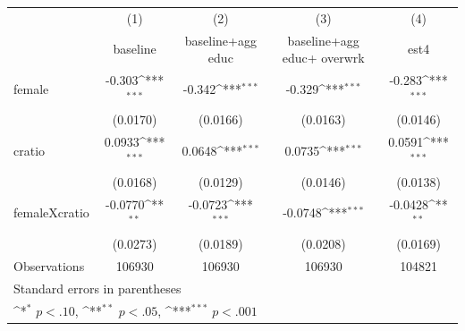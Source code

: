 {
\def\sym#1{\ifmmode^{#1}\else\(^{#1}\)\fi}
\begin{tabular}{l*{4}{c}}
\hline\hline
                    &\multicolumn{1}{c}{(1)}&\multicolumn{1}{c}{(2)}&\multicolumn{1}{c}{(3)}&\multicolumn{1}{c}{(4)}\\
                    &\multicolumn{1}{c}{baseline }&\multicolumn{1}{c}{baseline+agg educ}&\multicolumn{1}{c}{baseline+agg educ+ overwrk}&\multicolumn{1}{c}{est4}\\
\hline
female              &      -0.303\sym{***}&      -0.342\sym{***}&      -0.329\sym{***}&      -0.283\sym{***}\\
                    &    (0.0170)         &    (0.0166)         &    (0.0163)         &    (0.0146)         \\
[1em]
cratio              &      0.0933\sym{***}&      0.0648\sym{***}&      0.0735\sym{***}&      0.0591\sym{***}\\
                    &    (0.0168)         &    (0.0129)         &    (0.0146)         &    (0.0138)         \\
[1em]
femaleXcratio       &     -0.0770\sym{**} &     -0.0723\sym{***}&     -0.0748\sym{***}&     -0.0428\sym{**} \\
                    &    (0.0273)         &    (0.0189)         &    (0.0208)         &    (0.0169)         \\
\hline
Observations        &      106930         &      106930         &      106930         &      104821         \\
\hline\hline
\multicolumn{5}{l}{\footnotesize Standard errors in parentheses}\\
\multicolumn{5}{l}{\footnotesize \sym{*} \(p<.10\), \sym{**} \(p<.05\), \sym{***} \(p<.001\)}\\
\end{tabular}
}

